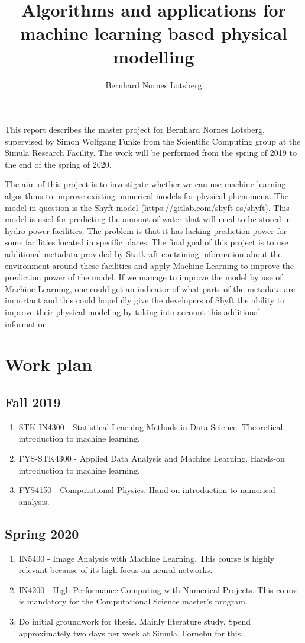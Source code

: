\documentclass[a4paper,12pt,english]{article}
\title{Algorithms and applications for machine learning based physical modelling}
\author{Bernhard Nornes Lotsberg}
\begin{document}
\maketitle
This report describes the master project for Bernhard Nornes Lotsberg, supervised by Simon Wolfgang Funke from the Scientific Computing group at the Simula Research Facility. The work will be performed from the spring of 2019 to the end of the spring of 2020.

The aim of this project is to investigate whether we can use machine learning algorithms to improve existing numerical models for physical phenomena. The model in question is the Shyft model (\url{https://gitlab.com/shyft-os/shyft}). This model is used for predicting the amount of water that will need to be stored in hydro power facilities. The problem is that it has lacking prediction power for some facilities located in specific places.
 The final goal of this project is to use additional metadata provided by Statkraft containing information about the environment around these facilities and apply Machine Learning to improve the prediction power of the model. If we manage to improve the model by use of Machine Learning, one could get an indicator of what parts of the metadata are important and this could hopefully give the developers of Shyft the ability to improve their physical modeling by taking into account this additional information.

\section{Work plan}
\subsection{Fall 2019}
\begin{enumerate}
\item STK-IN4300 - Statistical Learning Methods in Data Science. Theoretical introduction to machine learning.
\item FYS-STK4300 - Applied Data Analysis and Machine Learning. Hands-on introduction to machine learning.
\item FYS4150 - Computational Physics. Hand on introduction to numerical analysis. 
\end{enumerate}
\subsection{Spring 2020}
\begin{enumerate}
\item IN5400 - Image Analysis with Machine Learning. This course is highly relevant because of its high focus on neural networks.
\item IN4200 - High Performance Computing with Numerical Projects. This course is mandatory for the Computational Science master's program.
\item Do initial groundwork for thesis. Mainly literature study. Spend approximately two days per week at Simula, Fornebu for this.
\end{enumerate}
\end{document}
